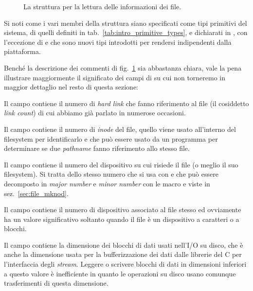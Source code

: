 \begin{figure}[!htb]
  \footnotesize
  \centering
  \begin{minipage}[c]{0.8\textwidth}
  \end{minipage} 
  \normalsize 
  \caption{La struttura  per la lettura delle informazioni dei 
    file.}
  \label{fig:file_stat_struct}
\end{figure}

Si noti come i vari membri della struttura siano specificati come tipi
primitivi del sistema, di quelli definiti in
tab.~\ref{tab:intro_primitive_types}, e dichiarati in ,
con l'eccezione di  e  che sono nuovi tipi
introdotti per rendersi indipendenti dalla piattaforma. 

Benché la descrizione dei commenti di fig.~\ref{fig:file_stat_struct} sia
abbastanza chiara, vale la pena illustrare maggiormente il significato dei
campi di  su cui non torneremo in maggior dettaglio nel resto di
questa sezione:
\begin{itemize*}
\item Il campo  contiene il numero di \textit{hard link} che
  fanno riferimento al file (il cosiddetto \textit{link count}) di cui abbiamo
  già parlato in numerose occasioni.
\item Il campo  contiene il numero di \textit{inode} del file,
  quello viene usato all'interno del filesystem per identificarlo e che può
  essere usato da un programma per determinare se due \textit{pathname} fanno
  riferimento allo stesso file.
\item Il campo  contiene il numero del dispositivo su cui risiede
  il file (o meglio il suo filesystem). Si tratta dello stesso numero che si
  usa con  e che può essere decomposto in \textit{major number} e
  \textit{minor number} con le macro  e  viste in
  sez.~\ref{sec:file_mknod}.
\item Il campo  contiene il numero di dispositivo associato al
  file stesso ed ovviamente ha un valore significativo soltanto quando il file
  è un dispositivo a caratteri o a blocchi.
\item Il campo  contiene la dimensione dei blocchi di dati
  usati nell'I/O su disco, che è anche la dimensione usata per la
  bufferizzazione dei dati dalle librerie del C per l'interfaccia degli
  \textit{stream}.  Leggere o scrivere blocchi di dati in dimensioni inferiori
  a questo valore è inefficiente in quanto le operazioni su disco usano
  comunque trasferimenti di questa dimensione.
\end{itemize*}

